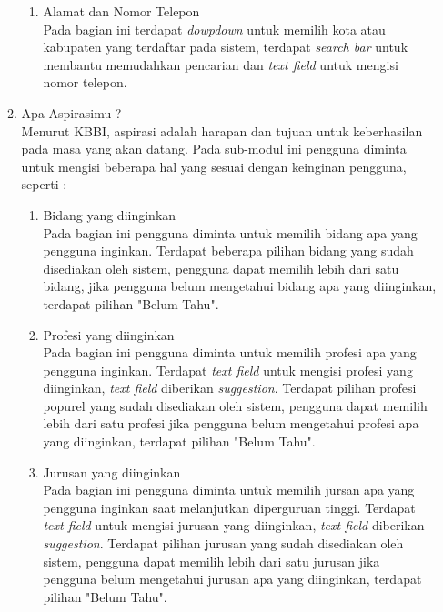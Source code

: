 \begin{enumerate}
\begin{enumerate}
\begin{enumerate}
                \item Alamat dan Nomor Telepon \\
                    Pada bagian ini terdapat \textit{dowpdown} untuk memilih kota atau kabupaten yang terdaftar  pada sistem, terdapat \textit{search bar} untuk membantu memudahkan pencarian dan \textit{text field} untuk mengisi nomor telepon.
            \end{enumerate}
        
        \item Apa Aspirasimu ? \\
            Menurut KBBI, aspirasi adalah harapan dan tujuan untuk keberhasilan pada masa yang akan datang. Pada sub-modul ini pengguna diminta untuk mengisi beberapa hal yang sesuai dengan keinginan pengguna, seperti :
            \begin{enumerate}
                \item Bidang yang diinginkan \\
                    Pada bagian ini pengguna diminta untuk memilih bidang apa yang pengguna inginkan. Terdapat beberapa pilihan bidang yang sudah disediakan oleh sistem, pengguna dapat memilih lebih dari satu bidang, jika pengguna belum mengetahui bidang apa yang diinginkan, terdapat pilihan "Belum Tahu".
                    
                \item Profesi yang diinginkan \\
                    Pada bagian ini pengguna diminta untuk memilih profesi apa yang pengguna inginkan. Terdapat \textit{text field} untuk mengisi profesi yang diinginkan, \textit{text field} diberikan \textit{suggestion}. Terdapat pilihan profesi popurel yang sudah disediakan oleh sistem, pengguna dapat memilih lebih dari satu profesi jika pengguna belum mengetahui profesi apa yang diinginkan, terdapat pilihan "Belum Tahu".
                    
                \item Jurusan yang diinginkan \\
                    Pada bagian ini pengguna diminta untuk memilih jursan apa yang pengguna inginkan saat melanjutkan diperguruan tinggi. Terdapat \textit{text field} untuk mengisi jurusan yang diinginkan, \textit{text field} diberikan \textit{suggestion}. Terdapat pilihan jurusan yang sudah disediakan oleh sistem, pengguna dapat memilih lebih dari satu jurusan jika pengguna belum mengetahui jurusan apa yang diinginkan, terdapat pilihan "Belum Tahu".
                 

\end{enumerate}
\end{enumerate}
\end{enumerate}
